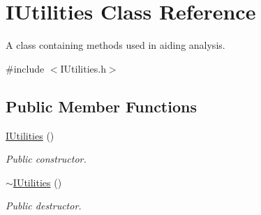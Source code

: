 \hypertarget{classIUtilities}{}\section{I\+Utilities Class Reference}
\label{classIUtilities}


A class containing methods used in aiding analysis.  




{\ttfamily \#include $<$I\+Utilities.\+h$>$}

\subsection*{Public Member Functions}
\begin{DoxyCompactItemize}
\item 
\mbox{\label{classIUtilities_af27b581f37f5044d0da9944de69bfea8}} 
\hyperlink{classIUtilities_af27b581f37f5044d0da9944de69bfea8}{I\+Utilities} ()
\begin{DoxyCompactList}\small\item\em Public constructor. \end{DoxyCompactList}\item 
\mbox{\label{classIUtilities_a79894025d9c2fa3d2cec7338e6b7da80}} 
\hyperlink{classIUtilities_a79894025d9c2fa3d2cec7338e6b7da80}{$\sim$\+I\+Utilities} ()
\begin{DoxyCompactList}\small\item\em Public destructor. \end{DoxyCompactList}\end{DoxyCompactItemize}
